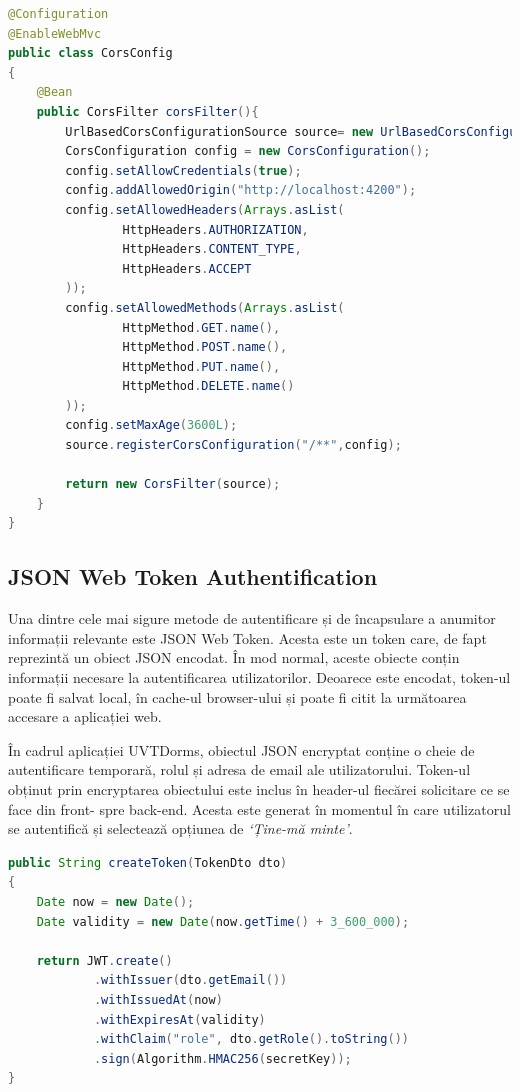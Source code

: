 \documentclass[12pt,a4paper]{report}
\theoremstyle{definition}
\theoremstyle{remark}
\begin{document}
\begin{lstlisting}[language=Java, caption={Clasa prin care se realizează configurarea CORS}]
@Configuration
@EnableWebMvc
public class CorsConfig
{
    @Bean
    public CorsFilter corsFilter(){
        UrlBasedCorsConfigurationSource source= new UrlBasedCorsConfigurationSource();
        CorsConfiguration config = new CorsConfiguration();
        config.setAllowCredentials(true);
        config.addAllowedOrigin("http://localhost:4200");
        config.setAllowedHeaders(Arrays.asList(
                HttpHeaders.AUTHORIZATION,
                HttpHeaders.CONTENT_TYPE,
                HttpHeaders.ACCEPT
        ));
        config.setAllowedMethods(Arrays.asList(
                HttpMethod.GET.name(),
                HttpMethod.POST.name(),
                HttpMethod.PUT.name(),
                HttpMethod.DELETE.name()
        ));
        config.setMaxAge(3600L);
        source.registerCorsConfiguration("/**",config);

        return new CorsFilter(source);
    }
}
\end{lstlisting}

\subsection{JSON Web Token Authentification}
\par Una dintre cele mai sigure metode de autentificare și de încapsulare a anumitor informații relevante este JSON Web Token\cite{jones2015json}. Acesta este un token care, de fapt reprezintă un obiect JSON encodat. În mod normal, aceste obiecte conțin informații necesare la autentificarea utilizatorilor. Deoarece este encodat, token-ul poate fi salvat local, în cache-ul browser-ului și poate fi citit la următoarea accesare a aplicației web.

\par În cadrul aplicației UVTDorms, obiectul JSON encryptat conține o cheie de autentificare temporară, rolul și adresa de email ale utilizatorului. Token-ul obținut prin encryptarea obiectului este inclus în header-ul fiecărei solicitare ce se face din front- spre back-end. Acesta este generat în momentul în care utilizatorul se autentifică și selectează opțiunea de \textit{`Ține-mă minte'}.

\begin{lstlisting}[language=Java, caption={Funcția de generare a token-ului}]
public String createToken(TokenDto dto)
{
    Date now = new Date();
    Date validity = new Date(now.getTime() + 3_600_000);

    return JWT.create()
            .withIssuer(dto.getEmail())
            .withIssuedAt(now)
            .withExpiresAt(validity)
            .withClaim("role", dto.getRole().toString())
            .sign(Algorithm.HMAC256(secretKey));
}
\end{lstlisting}
\end{document}
